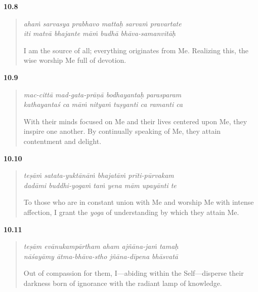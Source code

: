 \par\noindent\textbf{10.8}\par
\begin{verse}
\textit{ahaṁ sarvasya prabhavo mattaḥ sarvaṁ pravartate} \\
\textit{iti matvā bhajante māṁ budhā bhāva-samanvitāḥ}

\noindent I am the source of all; everything originates from Me. Realizing this, the wise worship Me full of devotion.
\end{verse}
\par



\par\noindent\textbf{10.9}\par
\begin{verse}
\textit{mac-cittā mad-gata-prāṇā bodhayantaḥ parasparam} \\
\textit{kathayantaś ca māṁ nityaṁ tuṣyanti ca ramanti ca}

\noindent With their minds focused on Me and their lives centered upon Me, they inspire one another. By continually speaking of Me, they attain contentment and delight.
\end{verse}
\par



\par\noindent\textbf{10.10}\par
\begin{verse}
\textit{teṣāṁ satata-yuktānāṁ bhajatāṁ prīti-pūrvakam} \\
\textit{dadāmi buddhi-yogaṁ taṁ yena mām upayānti te}

\noindent To those who are in constant union with Me and worship Me with intense affection, I grant the \textit{yoga} of understanding by which they attain Me.
\end{verse}
\par



\par\noindent\textbf{10.11}\par
\begin{verse}
\textit{teṣām evānukampārtham aham ajñāna-jaṁ tamaḥ} \\
\textit{nāśayāmy ātma-bhāva-stho jñāna-dīpena bhāsvatā}

\noindent Out of compassion for them, I---abiding within the Self---disperse their darkness born of ignorance with the radiant lamp of knowledge.
\end{verse}
\par


